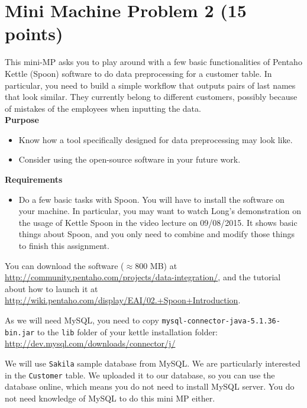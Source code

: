 \section*{Mini Machine Problem 2 (15 points)}

This mini-MP asks you to play around with a few basic functionalities of Pentaho Kettle (Spoon) software to do data preprocessing for a customer table. In particular, you need to build a simple workflow that outputs pairs of last names that look similar. They currently belong to different customers, possibly because of mistakes of the employees when inputting the data.\\

\textbf{Purpose} 
\begin{itemize}
\item Know how a tool specifically designed for data preprocessing may look like.
\item Consider using the open-source software in your future work.
\end{itemize}

\textbf{Requirements} 
\begin{itemize}
\item Do a few basic tasks with Spoon. You will have to install the software on your machine. In particular, you may want to watch Long's demonstration on the usage of Kettle Spoon in the video lecture on 09/08/2015. It shows basic things about Spoon, and you only need to combine and modify those things to finish this assignment.
\end{itemize}

You can download the software ($\approx800$ MB) at \url{http://community.pentaho.com/projects/data-integration/}, and the tutorial about how to launch it at \url{http://wiki.pentaho.com/display/EAI/02.+Spoon+Introduction}.

As we will need MySQL, you need to copy 
\texttt{mysql-connector-java-5.1.36-bin.jar} to the \texttt{lib} folder of your kettle installation folder: \url{http://dev.mysql.com/downloads/connector/j/}

We will use \texttt{Sakila} sample database from MySQL.  We are particularly interested in the \texttt{Customer} table. We uploaded it to our database, so you can use the database online, which means you do not need to install MySQL server. You do not need knowledge of MySQL to do this mini MP either.


